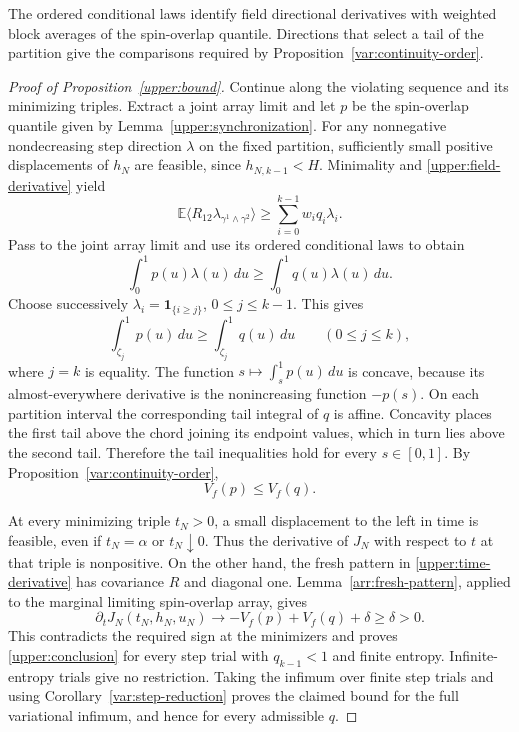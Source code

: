 The ordered conditional laws identify field directional derivatives with
weighted block averages of the spin-overlap quantile. Directions that
select a tail of the partition give the comparisons required by
Proposition~\ref{var:continuity-order}.

\begin{proof}[Proof of Proposition~\ref{upper:bound}]
Continue along the violating sequence and its minimizing
triples. Extract a joint array limit and let $p$ be the
spin-overlap quantile given by
Lemma~\ref{upper:synchronization}. For any nonnegative
nondecreasing step direction $\lambda$ on the fixed
partition, sufficiently small positive displacements of $h_N$
are feasible, since $h_{N,k-1}<H$. Minimality and
\eqref{upper:field-derivative} yield
\[
 \mathbb E\langle R_{12}
                  \lambda_{\gamma^1\wedge\gamma^2}\rangle
 \ge\sum_{i=0}^{k-1}w_iq_i\lambda_i.
\]
Pass to the joint array limit and use its ordered conditional
laws to obtain
\begin{equation}
\label{upper:cone-inequality}
 \int_0^1p(u)\lambda(u)\,du
 \ge\int_0^1q(u)\lambda(u)\,du.
\end{equation}
Choose successively $\lambda_i=\mathbf 1_{\{i\ge j\}}$,
$0\le j\le k-1$. This gives
\[
 \int_{\zeta_j}^1p(u)\,du
 \ge\int_{\zeta_j}^1q(u)\,du
 \qquad(0\le j\le k),
\]
where $j=k$ is equality. The function
$s\mapsto\int_s^1p(u)\,du$ is concave, because its
almost-everywhere derivative is the nonincreasing function
$-p(s)$. On each partition interval the corresponding tail
integral of $q$ is affine. Concavity places the first tail
above the chord joining its endpoint values, which in turn
lies above the second tail. Therefore the tail inequalities
hold for every $s\in[0,1]$. By
Proposition~\ref{var:continuity-order},
\begin{equation}
\label{upper:V-comparison}
 V_f(p)\le V_f(q).
\end{equation}

At every minimizing triple $t_N>0$, a small displacement to
the left in time is feasible, even if $t_N=\alpha$ or
$t_N\downarrow0$. Thus the derivative of $J_N$ with respect
to $t$ at that triple is nonpositive. On the other hand, the
fresh pattern in \eqref{upper:time-derivative} has covariance
$R$ and diagonal one. Lemma~\ref{arr:fresh-pattern}, applied
to the marginal limiting spin-overlap array, gives
\[
 \partial_t J_N(t_N,h_N,u_N)
 \longrightarrow -V_f(p)+V_f(q)+\delta\ge\delta>0.
\]
This contradicts the required sign at the minimizers and
proves \eqref{upper:conclusion} for every step trial with
$q_{k-1}<1$ and finite entropy. Infinite-entropy trials give
no restriction. Taking the infimum over finite step trials
and using Corollary~\ref{var:step-reduction} proves the
claimed bound for the full variational infimum, and hence
for every admissible $q$.
\end{proof}
